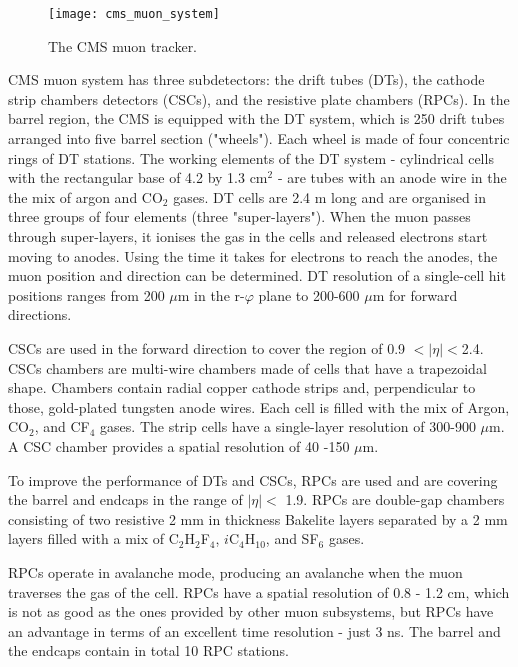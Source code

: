 \begin{normalsize}
 \begin{figure}[H]
  \centering
  \texttt{[image: cms\_muon\_system]}
  \caption[The CMS muon tracker]{The CMS muon tracker.}
  \label{cms_muon_system}
\end{figure}

CMS muon system has three subdetectors: the drift tubes (DTs), the cathode strip chambers detectors (CSCs), and the resistive plate chambers (RPCs). In the barrel region, the CMS is equipped with the DT system, which is 250 drift tubes  arranged into five barrel section ("wheels"). Each wheel is made of four concentric rings of DT stations. The working elements of the DT system - cylindrical cells with the rectangular base of 4.2 by 1.3 cm$^2$ - are tubes with an anode wire in the the mix of argon and CO$_2$ gases. DT cells are 2.4 m long and are organised in three groups of four elements (three "super-layers"). When the muon passes through super-layers, it ionises the gas in the cells and released electrons start moving to anodes. Using the time it takes for electrons to reach the anodes, the muon position and direction can be determined. DT resolution of a single-cell hit positions ranges from 200 $\mu$m in the r-$\varphi$ plane to 200-600 $\mu$m for forward directions. 

CSCs are used in the forward direction to cover the region of 0.9 $ <|\eta|<$2.4. CSCs chambers are multi-wire chambers made of cells  that have a trapezoidal shape. Chambers contain radial copper cathode strips and, perpendicular to those, gold-plated tungsten anode wires. Each cell is filled with the mix of Argon, CO$_2$, and CF$_4$ gases. The strip cells have a single-layer resolution of 300-900 $\mu$m. A CSC chamber provides a spatial resolution of 40 -150 $\mu$m.


To improve the performance of DTs and CSCs, RPCs are used and are covering the barrel and endcaps in the range of $|\eta| <$ 1.9. 
RPCs are double-gap chambers consisting of two resistive 2 mm in thickness Bakelite layers separated by a 2 mm layers filled with a mix of C$_2$H$_2$F$_4$, $i$C$_4$H$_{10}$, and SF$_6$ gases.

RPCs operate in avalanche mode, producing an avalanche when the muon traverses the gas of the cell. RPCs have a spatial resolution of 0.8 - 1.2 cm, which is not as good as the ones provided by other muon subsystems, but RPCs have an advantage in terms of an excellent time resolution - just 3 ns. The barrel and the endcaps contain in total 10 RPC stations.




\end{normalsize}
